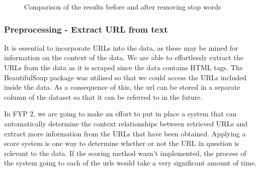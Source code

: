 \begin{figure}[H]
\caption{Comparison of the results before and after removing stop words }\label{special_character_comparison}
\end{figure}

\subsubsection{Preprocessing - Extract URL from text}
It is essential to incorporate URLs into the data, as these may be mined for information on the context of the data. We are able to effortlessly extract the URLs from the data as it is scraped since the data contains HTML tags. The BeautifulSoup package was utilised so that we could access the URLs included inside the data. As a consequence of this, the url can be stored in a separate column of the dataset so that it can be referred to in the future.

In FYP 2, we are going to make an effort to put in place a system that can automatically determine the context relationships between retrieved URLs and extract more information from the URLs that have been obtained. Applying a score system is one way to determine whether or not the URL in question is relevant to the data. If the scoring method wasn't implemented, the process of the system going to each of the urls would take a very significant amount of time.

